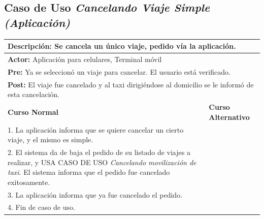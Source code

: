 \documentclass[a4paper]{article}
\begin{document}
\subsection{Caso de Uso \textit{Cancelando Viaje Simple (Aplicaci\'on)}}
\begin{center}
\begin{tabular}{|p{10cm} | p{6cm}|}
\hline
\multicolumn{2}{|p{16cm}|}{\textbf{Descripci\'on:} Se cancela un \'unico viaje, pedido v\'ia la aplicaci\'on. } \\
\hline
\multicolumn{2}{|l|}{\textbf{Actor:} Aplicaci\'on para celulares, Terminal m\'ovil} \\
\hline
\multicolumn{2}{|l|}{\textbf{Pre:} Ya se seleccion\'o un viaje para cancelar. El usuario est\'a verificado.} \\
\hline
\multicolumn{2}{|p{16cm}|}{\textbf{Post:} El viaje fue cancelado y al taxi dirigi\'endose al domicilio se le inform\'o de esta cancelaci\'on.}\\
\hline
\textbf{Curso Normal}  & \textbf{Curso Alternativo} \\ \hline
1. La aplicaci\'on informa que se quiere cancelar un cierto viaje, y el mismo es simple. & \\ \hline
2. El sistema da de baja el pedido de su listado de viajes a realizar, y USA CASO DE USO \textit{Cancelando movilizaci\'on de taxi}. El sistema informa que el pedido fue cancelado exitosamente. & \\ \hline
3. La aplicaci\'on informa que ya fue cancelado el pedido. & \\ \hline
4. Fin de caso de uso. & \\ \hline
\end{tabular}
\end{center}
\end{document}
